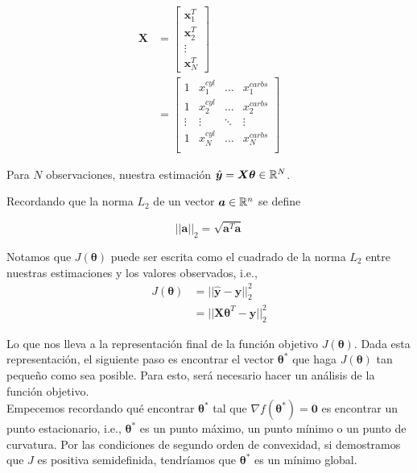 \documentclass[11pt]{article}
\begin{document}
\begin{align}
	 \bm{X} &= \begin{bmatrix}
	 	\bm{x}_1^T \\
	 	\bm{x}_2^T \\
	 	\vdots \\
	 	\bm{x}_N^T
	     \end{bmatrix}\\
	 &= \begin{bmatrix}
	        1 & x^{cyl}_1 & \ldots & x^{carbs}_1 \\
	        1 & x^{cyl}_2 & \ldots & x^{carbs}_2 \\
	        \vdots & \vdots & \ddots & \vdots\\
	        1 & x^{cyl}_N & \ldots & x^{carbs}_N \\
	     \end{bmatrix}
\end{align}

Para $N$ observaciones, nuestra estimación $\hat{\bm y} = \bm{X}\bm{\theta} \in \mathbb{R}^{N}$.

Recordando que la norma $L_2$ de un vector $\bm{a}\in\mathbb{R}^n$ se define

\begin{equation}
  ||\bm{a}||_2 = \sqrt{\bm{a}^T \bm{a}}
\end{equation}

Notamos que $J(\bm\theta)$ puede ser escrita como el cuadrado de la norma $L_2$ entre nuestras estimaciones y los valores observados, i.e., 
\begin{align}
	J(\bm\theta) &= ||\hat{\bm{y}} - \bm{y}||_2^2 \\
	          &=   ||\bm{X}\bm{\theta}^T - \bm{y}||_2^2
\end{align}

Lo que nos lleva a la representación final de la función objetivo $J(\bm\theta)$. Dada esta representación, el siguiente paso es encontrar el vector $\bm\theta^*$ que haga $J(\bm\theta)$ tan pequeño como sea posible. Para esto, será necesario hacer un análisis de la función objetivo.\\

Empecemos recordando qué encontrar $\bm\theta^*$ tal que $\nabla f(\bm\theta^*)= \bm{0}$ es encontrar un punto estacionario, i.e., $\bm\theta^*$ es un punto máximo, un punto mínimo o un punto de curvatura. Por las condiciones de segundo orden de convexidad, si demostramos que $J$ es positiva semidefinida, tendríamos que $\bm\theta^*$ es un mínimo global.\\
\end{document}
